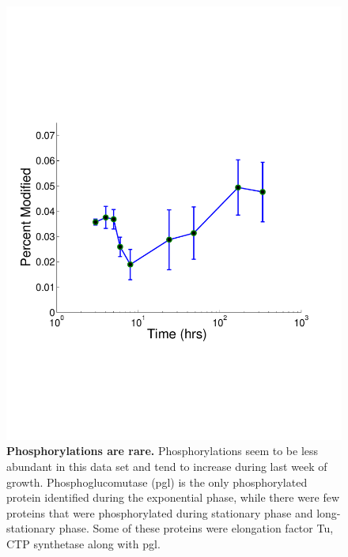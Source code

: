 \documentclass[12pt]{article}
\begin{document}
\clearpage
\begin{figure}[p]
\centerline{\includegraphics[width=5in]{Figures/Phosphorylations.pdf}}
\caption{\label{fig:Phos}\textbf{Phosphorylations are rare.} Phosphorylations seem to be less abundant in this data set and tend to increase during last week of growth. Phosphoglucomutase (pgl) is the only phosphorylated protein identified during the exponential phase, while there were few proteins that were phosphorylated during stationary phase and long-stationary phase. Some of these proteins were elongation factor Tu, CTP synthetase along with pgl.}
\end{figure}
\end{document}
